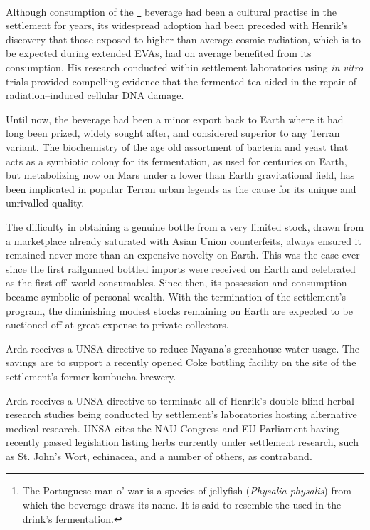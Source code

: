 Although consumption of the \footnote{The Portuguese man o' war is a species of jellyfish ({\it Physalia physalis}) from which the beverage draws its name. It is said to resemble the  used in the drink's fermentation.} beverage had been a cultural practise in the settlement for years, its widespread adoption had been preceded with Henrik's discovery that those exposed to higher than average cosmic radiation, which is to be expected during extended EVAs, had on average benefited from its consumption. His research conducted within settlement laboratories using {\it in vitro} trials provided compelling evidence that the fermented tea aided in the repair of radiation--induced cellular DNA damage. 

Until now, the beverage had been a minor export back to Earth where it had long been prized, widely sought after, and considered superior to any Terran variant. The biochemistry of the age old assortment of bacteria and yeast that acts as a symbiotic colony for its fermentation, as used for centuries on Earth, but metabolizing now on Mars under a lower than Earth gravitational field, has been implicated in popular Terran urban legends as the cause for its unique and unrivalled quality. 

The difficulty in obtaining a genuine bottle from a very limited stock, drawn from a marketplace already saturated with Asian Union counterfeits, always ensured it remained never more than an expensive novelty on Earth. This was the case ever since the first railgunned bottled imports were received on Earth and celebrated as the first off--world consumables. Since then, its possession and consumption became symbolic of personal wealth. With the termination of the settlement's program, the diminishing modest stocks remaining on Earth are expected to be auctioned off at great expense to private collectors.
\StopTimelineDate

Arda receives a UNSA directive to reduce Nayana's greenhouse water usage. The savings are to support a recently opened Coke bottling facility on the site of the settlement's former kombucha brewery.
\StopTimelineDate

Arda receives a UNSA directive to terminate all of Henrik's double blind herbal research studies being conducted by settlement's laboratories hosting alternative medical research. UNSA cites the NAU Congress and EU Parliament having recently passed legislation listing herbs currently under settlement research, such as St. John's Wort, echinacea, and a number of others, as contraband. 

